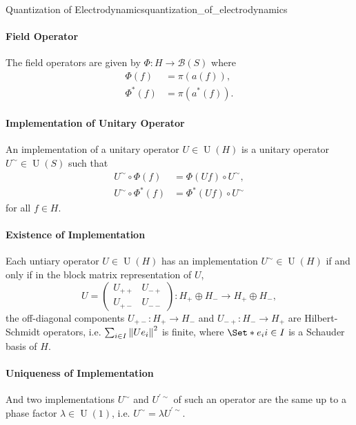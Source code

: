 \documentclass{article}
\begin{document}
\begin{example}{Quantization of Electrodynamics}{quantization_of_electrodynamics}
    \paragraph*{Field Operator}
    The field operators are given by $\Phi: H \rightarrow \mathscr{B}(S)$ where
    \begin{align*}
        \Phi(f) &= \pi(a(f)), \\
        \Phi^*(f) &= \pi(a^*(f)).
    \end{align*}
    \paragraph*{Implementation of Unitary Operator}
    An implementation of a unitary operator $U\in \operatorname{U}(H)$ is a unitary operator $U^\sim \in \operatorname{U}(S)$ such that
    \begin{align*}
        U^\sim \circ \Phi(f) &= \Phi(Uf)\circ U^\sim, \\
        U^\sim \circ \Phi^*(f) &= \Phi^*(Uf)\circ U^\sim
    \end{align*}
    for all $f\in H$.
    \paragraph*{Existence of Implementation}
    Each untiary operator $U\in \operatorname{U}(H)$ has an implementation $U^\sim \in \operatorname{U}(H)$ if and only if in the block matrix representation of $U$,
    \[ U = \begin{pmatrix}
        U_{++} & U_{-+} \\
        U_{+-} & U_{--}
    \end{pmatrix}: H_+ \oplus H_- \rightarrow H_+ \oplus H_-, \]
    the off-diagonal components $U_{+-}: H_+ \rightarrow H_-$ and $U_{-+}: H_- \rightarrow H_+$ are Hilbert-Schmidt operators, i.e. $\sum_{i\in I} \norm{U e_i}^2$ is finite, where $\Set*{e_i}{i\in I}$ is a Schauder basis of $H$.
    \paragraph*{Uniqueness of Implementation}
    And two implementations $U^\sim$ and $U^{'\sim}$ of such an operator are the same up to a phase factor $\lambda \in \operatorname{U}(1)$, i.e. $U^\sim = \lambda U^{'\sim}$.

\end{example}
\end{document}
